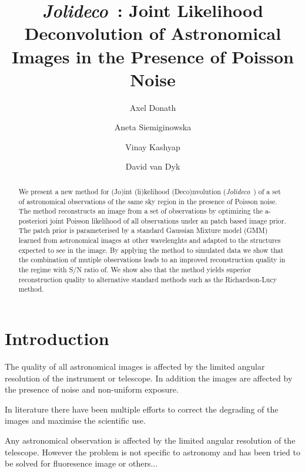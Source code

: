 \documentclass[twocolumn]{aastex631}
\newcommand{\jolideco}{\textit{Jolideco}~}
\begin{document}
    \title{\jolideco: Joint Likelihood Deconvolution of Astronomical Images in the Presence of Poisson Noise}

    \author[0000-0003-4568-7005]{Axel Donath}
    \author[0000-0002-0905-7375]{Aneta Siemiginowska}
    \author[0000-0002-3869-7996]{Vinay Kashyap}
    \author[0000-0000-0000-0000]{David van Dyk}


    \begin{abstract}
        We present a new method for (Jo)int (li)kelihood  (Deco)nvolution (\jolideco) of a set of astronomical observations of the same sky region in the presence of Poisson noise.
        The method reconstructs an image from a set of observations
        by optimizing the a-posteriori joint Poisson likelihood of all
        observations under an patch based image prior. The patch
        prior is parameterised by a standard Gaussian Mixture model (GMM)
        learned from astronomical images at other wavelenghts and
        adapted to the structures expected to see in the image.
        By applying the method to simulated data we show that
        the combination of mutiple observations leads to an
        improved reconstruction quality in the regime with S/N ratio of.
        We show also that the method yields superior reconstruction quality
        to alternative standard methods such as the Richardson-Lucy method.
    \end{abstract}



    \section{Introduction}
    The quality of all astronomical images is affected by the limited angular resolution of the instrument
    or telescope. In addition the images are affected by the presence of noise and non-uniform exposure.

    In literature there have been multiple efforts to correct the degrading of the images
    and maximise the scientific use. 
    
    Any astronomical observation is affected by the limited angular resolution of the telescope. However the problem is not specific to astronomy and has been tried to 
    be solved for fluoresence image or others...
\end{document}
